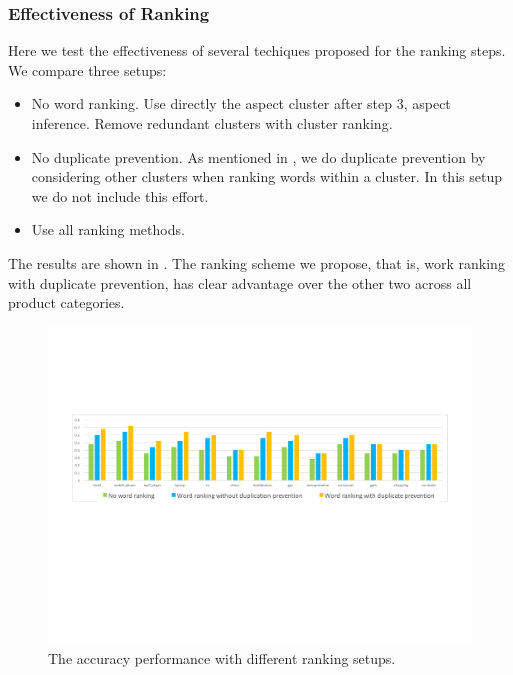\subsubsection{Effectiveness of Ranking}

Here we test the effectiveness of several techiques proposed for 
the ranking steps.
We compare three setups:
\begin{itemize}
    \item No word ranking. 
          Use directly the aspect cluster after step 3, aspect inference. 
          Remove redundant clusters with cluster ranking.
    \item No duplicate prevention.
          As mentioned in , we do duplicate prevention
          by considering other clusters when ranking words within a cluster.
          In this setup we do not include this effort.
    \item Use all ranking methods.
\end{itemize}

The results are shown in .
The ranking scheme we propose, that is, work ranking with duplicate prevention,
has clear advantage over the other two across all product categories.

\begin{figure}[th]
\centering
\includegraphics[width=2.0\columnwidth]{figures/rankingeffect}
\caption{The accuracy performance with different ranking setups.}
\label{fig:rankingeffect}
\end{figure}



